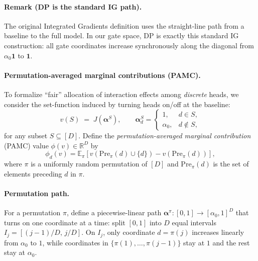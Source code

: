 \paragraph{Remark (DP is the standard IG path).}
The original Integrated Gradients definition uses the straight-line path from a baseline to the full model. In our gate space, DP is exactly this standard IG construction: all gate coordinates increase synchronously along the diagonal from $\alpha_0\mathbf{1}$ to $\mathbf{1}$.

\paragraph{Permutation-averaged marginal contributions (PAMC).}
To formalize ``fair'' allocation of interaction effects among \emph{discrete} heads, we consider the set-function induced by turning heads on/off at the baseline:
\begin{equation}
v(S) \;=\; J(\boldsymbol{\alpha}^{S}),
\qquad
\boldsymbol{\alpha}^{S}_d =
\begin{cases}
1, & d\in S,\\
\alpha_0, & d\notin S,
\end{cases}
\label{eq:game_v}
\end{equation}
for any subset $S\subseteq [D]$.
Define the \emph{permutation-averaged marginal contribution} (PAMC) value $\phi(v)\in\mathbb{R}^D$ by
\begin{equation}
\phi_d(v)
=
\mathbb{E}_{\pi}\!\left[v(\mathrm{Pre}_{\pi}(d)\cup\{d\})-v(\mathrm{Pre}_{\pi}(d))\right],
\label{eq:pamc_perm}
\end{equation}
where $\pi$ is a uniformly random permutation of $[D]$ and $\mathrm{Pre}_{\pi}(d)$ is the set of elements preceding $d$ in $\pi$.

\paragraph{Permutation path.}
For a permutation $\pi$, define a piecewise-linear path $\boldsymbol{\alpha}^{\pi}:[0,1]\to[\alpha_0,1]^D$ that turns on one coordinate at a time: split $[0,1]$ into $D$ equal intervals $I_j=[(j-1)/D,\,j/D]$. On $I_j$, only coordinate $d=\pi(j)$ increases linearly from $\alpha_0$ to $1$, while coordinates in $\{\pi(1),\dots,\pi(j-1)\}$ stay at $1$ and the rest stay at $\alpha_0$.

